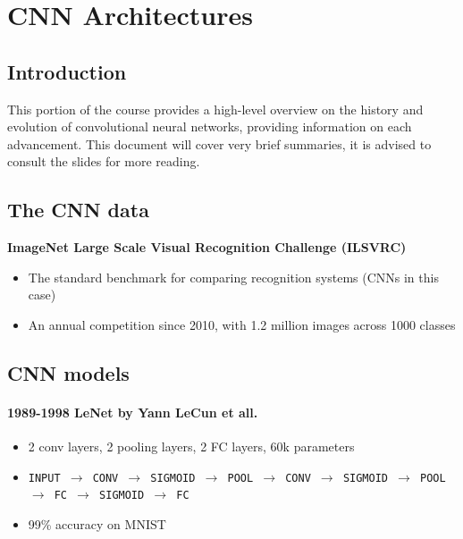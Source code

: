 \chapter{CNN Architectures}

\section{Introduction}

This portion of the course provides a high-level overview on the history and evolution of convolutional neural networks, providing information on each advancement. This document will cover very brief summaries, it is advised to consult the slides for more reading.


\section{The CNN data}
\textbf{ImageNet Large Scale Visual Recognition Challenge (ILSVRC)}
\begin{itemize}
    \item The standard benchmark for comparing recognition systems (CNNs in this case)
    \item An annual competition since 2010, with 1.2 million images across 1000 classes
\end{itemize}

\section{CNN models}
\subsubsection{1989-1998  LeNet by Yann LeCun et all.}
\begin{itemize}
    \item 2 conv layers, 2 pooling layers, 2 FC layers, 60k parameters
    \item  \texttt{INPUT $\rightarrow$ CONV $\rightarrow$ SIGMOID $\rightarrow$ POOL $\rightarrow$ CONV $\rightarrow$ SIGMOID $\rightarrow$ POOL $\rightarrow$ FC $\rightarrow$ SIGMOID $\rightarrow$ FC}

    \item 99\% accuracy on MNIST
\end{itemize}

